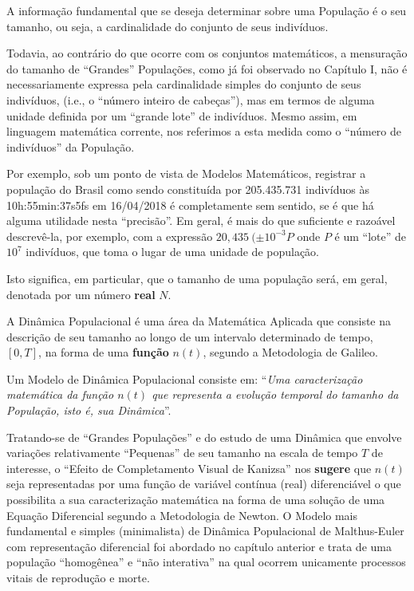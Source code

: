 A informação fundamental que se deseja determinar sobre uma População é o seu tamanho, ou seja, a cardinalidade do conjunto de seus indivíduos.

Todavia, ao contrário do que ocorre com os conjuntos matemáticos, a mensuração do tamanho de ``Grandes'' Populações, como já foi observado no Capítulo I, não é necessariamente expressa pela cardinalidade simples do conjunto de seus indivíduos, (i.e., o ``número inteiro de cabeças''), mas em termos de alguma unidade definida por um ``grande lote'' de indivíduos. Mesmo assim, em linguagem matemática corrente, nos referimos a esta medida como o ``número de indivíduos'' da População.

Por exemplo, sob um ponto de vista de Modelos Matemáticos, registrar a população do Brasil como sendo constituída por 205.435.731 indivíduos às 10h:55min:37s5fs em 16/04/2018 é completamente sem sentido, se é que há alguma utilidade nesta ``precisão''. Em geral, é mais do que suficiente e razoável descrevê-la, por exemplo, com a expressão \(20,435\ (\pm 10^{-3}P\) onde \(P\) é um ``lote'' de \(10^{7}\) indivíduos, que toma o lugar de uma unidade de população.

Isto significa, em particular, que o tamanho de uma população será, em geral, denotada por um número \textbf{real} \(N\).


A Dinâmica Populacional é uma área da Matemática Aplicada que consiste na descrição de seu tamanho ao longo de um intervalo determinado de tempo, \([0, T]\), na forma de uma \textbf{função} \(n(t)\), segundo a Metodologia de Galileo.

Um Modelo de Dinâmica Populacional consiste em: ``\textit{Uma caracterização matemática da função \(n(t)\) que representa a evolução temporal do tamanho da População, isto é, sua Dinâmica}''.


Tratando-se de ``Grandes Populações'' e do estudo de uma Dinâmica que envolve variações relativamente ``Pequenas'' de seu tamanho na escala de tempo \(T\) de interesse, o ``Efeito de Completamento Visual de Kanizsa'' nos \textbf{sugere} que \(n(t)\) seja representadas por uma função de variável contínua (real) diferenciável o que possibilita a sua caracterização matemática na forma de uma solução de uma Equação Diferencial segundo a Metodologia de Newton. O Modelo mais fundamental e simples (minimalista) de Dinâmica Populacional de Malthus-Euler com representação diferencial foi abordado no capítulo anterior e trata de uma população ``homogênea'' e ``não interativa'' na qual ocorrem unicamente processos vitais de reprodução e morte.

